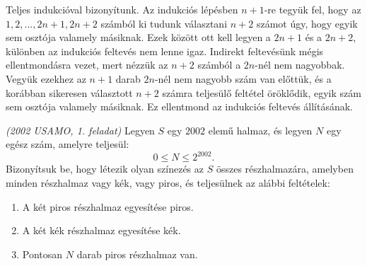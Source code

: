 \begin{solution}
Teljes indukcióval bizonyítunk. Az indukciós lépésben $n+1$-re tegyük
fel, hogy az $1,2,\dots,2n+1,2n+2$ számból ki tudunk választani $n+2$
számot úgy, hogy egyik sem osztója valamely másiknak. Ezek között
ott kell legyen a $2n+1$ és a $2n+2$, különben az indukciós feltevés
nem lenne igaz. Indirekt feltevésünk mégis ellentmondásra vezet, mert
nézzük az $n+2$ számból a $2n$-nél nem nagyobbak. Vegyük ezekhez
az $n+1$ darab $2n$-nél nem nagyobb szám van előttük, és a korábban
sikeresen választott $n+2$ számra teljesülő feltétel öröklődik, egyik
szám sem osztója valamely másiknak. Ez ellentmond az indukciós feltevés
állításának. 
\end{solution}
\begin{extraproblem}
\emph{ (2002 USAMO, 1. feladat)} Legyen $S$ egy $2002$ elemű halmaz,
és legyen $N$ egy egész szám, amelyre teljesül: 
\[
0\leq N\leq2^{2002}.
\]
Bizonyítsuk be, hogy létezik olyan színezés az $S$ összes részhalmazára,
amelyben minden részhalmaz vagy kék, vagy piros, és teljesülnek az
alábbi feltételek:
\begin{enumerate}
\item A két piros részhalmaz egyesítése piros. 
\item A két kék részhalmaz egyesítése kék. 
\item Pontosan $N$ darab piros részhalmaz van. 
\end{enumerate}
\end{extraproblem}

